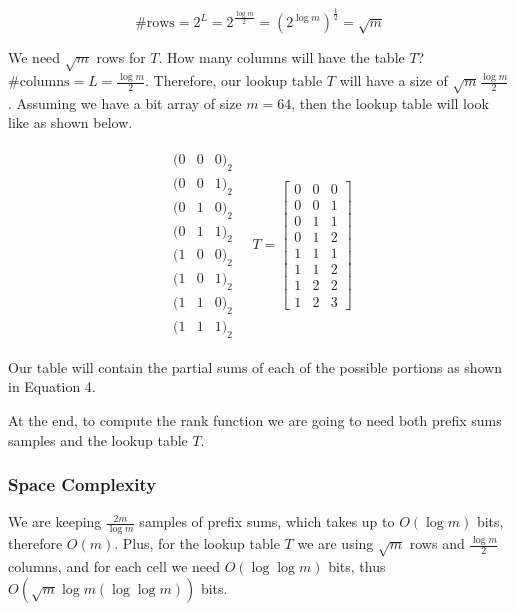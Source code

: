 \documentclass{article}
\begin{document}
\begin{equation}
    \textrm{\#rows} = 2^L = 2^{\frac{\log m}{2}} = (2^{\log m})^{\frac{1}{2}} = \sqrt m
\end{equation}

\noindent We need $\sqrt m$ rows for $T$. How many columns will have the table $T$? $\# \textrm{columns} = L = \frac{\log m}{2}$. Therefore, our lookup table $T$ will have a size of $\sqrt m \frac{\log m}{2}$.
Assuming we have a bit array of size $m = 64$, then the lookup table will look like as shown below.

\begin{align}
     \begin{matrix}
         (0 & 0 & 0)_2 \\
         (0 & 0 & 1)_2 \\
         (0 & 1 & 0)_2 \\
         (0 & 1 & 1)_2 \\
         (1 & 0 & 0)_2 \\
         (1 & 0 & 1)_2 \\
         (1 & 1 & 0)_2 \\
         (1 & 1 & 1)_2
     \end{matrix} \quad
     T = 
     \begin{bmatrix}
        0 & 0 & 0 \\
        0 & 0 & 1 \\
        0 & 1 & 1 \\
        0 & 1 & 2 \\
        1 & 1 & 1 \\
        1 & 1 & 2 \\
        1 & 2 & 2 \\
        1 & 2 & 3
    \end{bmatrix} 
\end{align}

\noindent Our table will contain the partial sums of each of the possible portions as shown in Equation 4.

\noindent At the end, to compute the rank function we are going to need
both prefix sums samples and the lookup table $T$.

\subsubsection{Space Complexity}

We are keeping $\frac{2m}{\log m}$ samples of prefix sums, which takes up to $O(\log m)$ bits,
therefore $O(m)$.
Plus, for the lookup table $T$ we are using $\sqrt m$ rows and $\frac{\log m}{2}$ columns, and for each cell we
need $O(\log \log m)$ bits, thus $O(\sqrt{m}\log m (\log \log m))$ bits.
\end{document}
